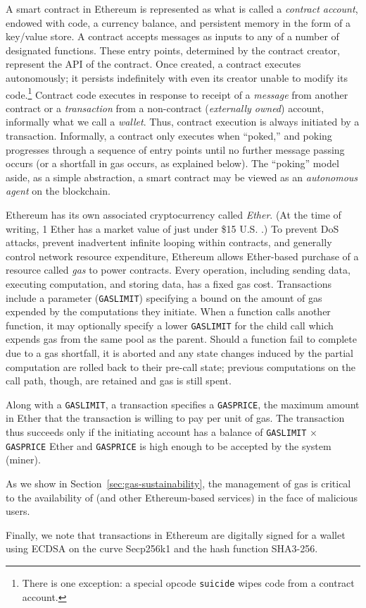 A smart contract in Ethereum is represented as what is called a \emph{contract account}, endowed with code, a currency balance, and persistent memory in the form of a key/value store. A contract accepts messages as inputs to any of a number of designated functions. These entry points, determined by the contract creator, represent the API of the contract. Once created, a contract executes autonomously; it persists indefinitely with even its creator unable to modify its code.\footnote{There is one exception: a special opcode \texttt{suicide} wipes code from a contract account.} Contract code executes in response to receipt of a \emph{message} from another contract or a \emph{transaction} from a non-contract (\emph{externally owned}) account, informally what we call a \emph{wallet}. Thus, contract execution is always initiated by a transaction. Informally, a contract only executes when ``poked,'' and poking progresses through a sequence of entry points until no further message passing occurs (or a shortfall in gas occurs, as explained below). The ``poking'' model aside, as a simple abstraction, a smart contract may be viewed as an {\em autonomous agent} on the blockchain.

Ethereum has its own associated cryptocurrency called \emph{Ether}. (At the time of writing, 1 Ether has a market value of just under \$15 U.S. \cite{ethprice}.)
To prevent DoS attacks, prevent inadvertent infinite looping within contracts, and generally control network resource expenditure,
Ethereum allows Ether-based purchase of a resource called \emph{gas} to power contracts.
Every operation, including sending data, executing computation, and storing data, has a fixed gas cost.
Transactions include a parameter (\texttt{GASLIMIT}) specifying a bound on the amount of gas expended by the computations they initiate.
When a function calls another function, it may optionally specify a lower \texttt{GASLIMIT} for the child call which expends gas from the same pool as the parent.
Should a function fail to complete due to a gas shortfall,
it is aborted and any state changes induced by the partial computation are rolled back to their pre-call state;
previous computations on the call path, though, are retained and gas is still spent.

Along with a \texttt{GASLIMIT}, a transaction specifies a \texttt{GASPRICE}, the maximum amount in Ether that the transaction is willing to pay per unit of gas. The transaction thus succeeds only if the initiating account has a balance of \texttt{GASLIMIT} $\times$ \texttt{GASPRICE} Ether and \texttt{GASPRICE} is high enough to be accepted by the system (miner). 

As we show in Section~\ref{sec:gas-sustainability}, the management of gas is critical to the availability of \tc (and other Ethereum-based services) in the face of malicious users.

Finally, we note that transactions in Ethereum are digitally signed for a wallet using ECDSA on the curve Secp256k1 and the hash function SHA3-256.



